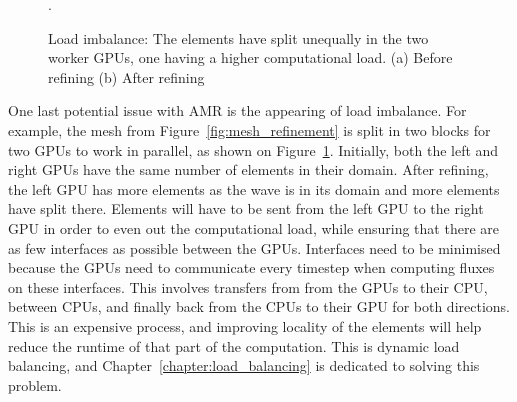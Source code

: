 \begin{figure}[H]
	\centering
	\hfill
	\caption{Load imbalance: The elements have split unequally in the two worker GPUs, one having a higher computational load. (a) Before refining (b) After refining}.
	\label{fig:load_imbalance}
\end{figure}

One last potential issue with AMR is the appearing of load imbalance. For example, the mesh from
Figure~\ref{fig:mesh_refinement} is split in two blocks for two GPUs to work in parallel, as shown
on Figure~\ref{fig:load_imbalance}. Initially, both the left and right GPUs have the same number of
elements in their domain. After refining, the left GPU has more elements as the wave is in its
domain and more elements have split there. Elements will have to be sent from the left GPU to the
right GPU in order to even out the computational load, while ensuring that there are as few
interfaces as possible between the GPUs. Interfaces need to be minimised because the GPUs need to
communicate every timestep when computing fluxes on these interfaces. This involves transfers from
from the GPUs to their CPU, between CPUs, and finally back from the CPUs to their GPU for both
directions. This is an expensive process, and improving locality of the elements will help reduce
the runtime of that part of the computation. This is dynamic load balancing, and
Chapter~\ref{chapter:load_balancing} is dedicated to solving this problem.

